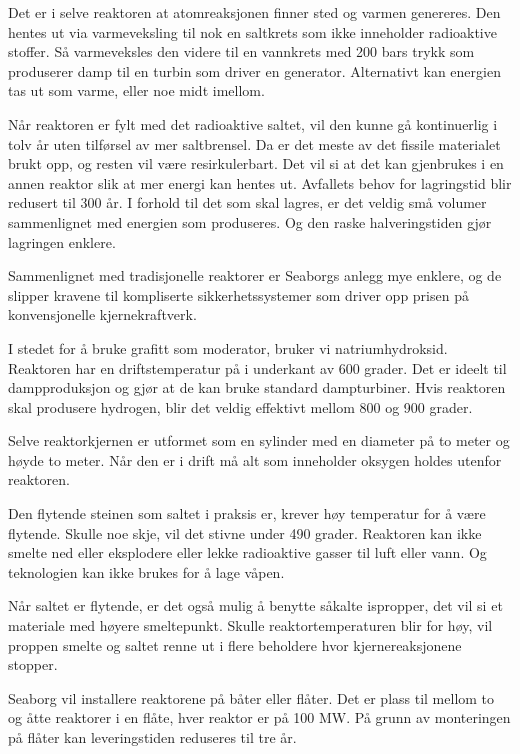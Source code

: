 \documentclass[
]{book}
\begin{document}
Det er i selve reaktoren at atomreaksjonen finner sted og varmen genereres. Den hentes ut via varmeveksling til nok en saltkrets som ikke inneholder radioaktive stoffer. Så varmeveksles den videre til en vannkrets med 200 bars trykk som produserer damp til en turbin som driver en generator. Alternativt kan energien tas ut som varme, eller noe midt imellom.

Når reaktoren er fylt med det radioaktive saltet, vil den kunne gå kontinuerlig i tolv år uten tilførsel av mer saltbrensel. Da er det meste av det fissile materialet brukt opp, og resten vil være resirkulerbart. Det vil si at det kan gjenbrukes i en annen reaktor slik at mer energi kan hentes ut. Avfallets behov for lagringstid blir redusert til 300 år. I forhold til det som skal lagres, er det veldig små volumer sammenlignet med energien som produseres. Og den raske halveringstiden gjør lagringen enklere.

Sammenlignet med tradisjonelle reaktorer er Seaborgs anlegg mye enklere, og de slipper kravene til kompliserte sikkerhetssystemer som driver opp prisen på konvensjonelle kjernekraftverk.

I stedet for å bruke grafitt som moderator, bruker vi natriumhydroksid.
Reaktoren har en driftstemperatur på i underkant av 600 grader. Det er ideelt til dampproduksjon og gjør at de kan bruke standard dampturbiner. Hvis reaktoren skal produsere hydrogen, blir det veldig effektivt mellom 800 og 900 grader.

Selve reaktorkjernen er utformet som en sylinder med en diameter på to meter og høyde to meter. Når den er i drift må alt som inneholder oksygen holdes utenfor reaktoren.

Den flytende steinen som saltet i praksis er, krever høy temperatur for å være flytende. Skulle noe skje, vil det stivne under 490 grader. Reaktoren kan ikke smelte ned eller eksplodere eller lekke radioaktive gasser til luft eller vann. Og teknologien kan ikke brukes for å lage våpen.

Når saltet er flytende, er det også mulig å benytte såkalte ispropper, det vil si et materiale med høyere smeltepunkt. Skulle reaktortemperaturen blir for høy, vil proppen smelte og saltet renne ut i flere beholdere hvor kjernereaksjonene stopper.

Seaborg vil installere reaktorene på båter eller flåter.
Det er plass til mellom to og åtte reaktorer i en flåte, hver reaktor er på 100 MW. På grunn av monteringen på flåter kan leveringstiden reduseres til tre år.
\end{document}
